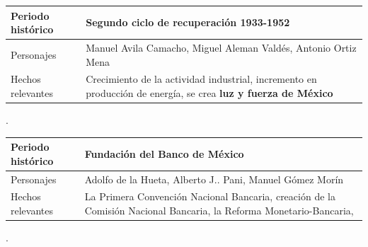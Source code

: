 \documentclass[12pt]{article}
\begin{document}
	\begin{longtable}[]{@{}ll@{}}
	
		\begin{minipage}[b]{0.54\columnwidth}\raggedright
			Periodo histórico\strut
		\end{minipage} & 
			\begin{minipage}[b]{0.40\columnwidth}\raggedright
				Segundo ciclo de recuperación 1933-1952\strut
		\end{minipage}\tabularnewline
	
		\endhead
	
		\begin{minipage}[t]{0.54\columnwidth}\raggedright
			Personajes\strut
		\end{minipage} & 
			\begin{minipage}[t]{0.40\columnwidth}\raggedright
				Manuel Avila Camacho, Miguel Aleman Valdés, Antonio Ortiz Mena\strut
			\end{minipage}\tabularnewline
	
		\begin{minipage}[t]{0.54\columnwidth}\raggedright
			Hechos relevantes\strut
		\end{minipage} & 
			\begin{minipage}[t]{0.40\columnwidth}\raggedright
				Crecimiento de la actividad industrial, incremento en producción de energía, se crea \textbf{luz y fuerza de México}\strut
		\end{minipage}\tabularnewline
	
	\end{longtable}.\dotfill

	\begin{longtable}[]{@{}ll@{}}
	
		\begin{minipage}[b]{0.54\columnwidth}\raggedright
			Periodo histórico\strut
		\end{minipage} & 
			\begin{minipage}[b]{0.40\columnwidth}\raggedright
				Fundación del Banco de México\strut
			\end{minipage}\tabularnewline
	
	\endhead
	
		\begin{minipage}[t]{0.54\columnwidth}\raggedright
		Personajes\strut
		\end{minipage} & 
			\begin{minipage}[t]{0.40\columnwidth}\raggedright
				Adolfo de la Hueta, Alberto J.. Pani, Manuel Gómez Morín\strut
			\end{minipage}\tabularnewline
		
		\begin{minipage}[t]{0.54\columnwidth}\raggedright
			Hechos relevantes\strut
		\end{minipage} & 
			\begin{minipage}[t]{0.40\columnwidth}\raggedright
				La Primera Convención Nacional Bancaria, creación de la Comisión Nacional Bancaria, la Reforma Monetario-Bancaria,\strut
		\end{minipage}\tabularnewline

	\end{longtable}.\dotfill
\end{document}
